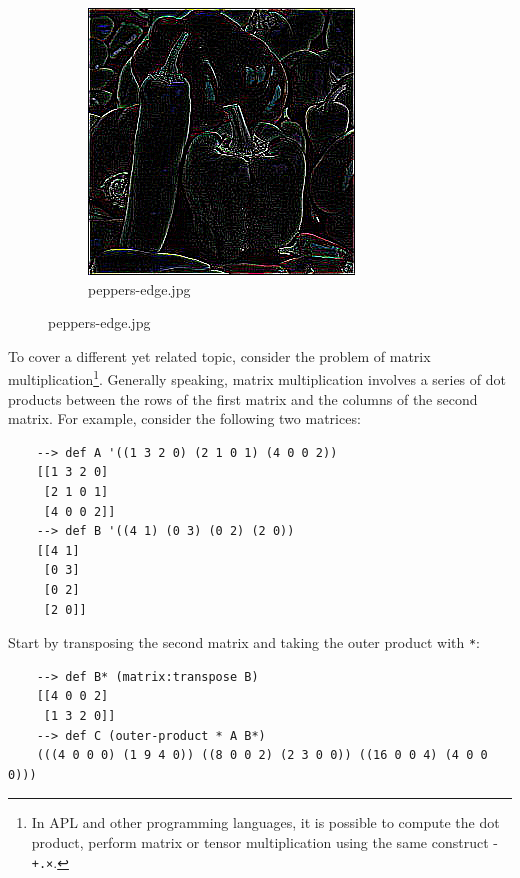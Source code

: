 \begin{figure}[H]
\begin{subfigure}{0.25\textwidth}
    \end{subfigure}
    \begin{subfigure}{0.25\textwidth}
        \caption{peppers-edge.jpg}
        \includegraphics[width=\textwidth]{figures/peppers-edge.jpg}
    \end{subfigure}
\end{figure}

To cover a different yet related topic, consider the problem of matrix multiplication\footnote{In APL and other programming languages, it is possible to compute the dot product, perform matrix or tensor multiplication using the same construct - \verb|+.×|.}. Generally speaking, matrix multiplication involves a series of dot products between the rows of the first matrix and the columns of the second matrix. For example, consider the following two matrices:

\begin{Verbatim}
    --> def A '((1 3 2 0) (2 1 0 1) (4 0 0 2))
    [[1 3 2 0]
     [2 1 0 1]
     [4 0 0 2]]
    --> def B '((4 1) (0 3) (0 2) (2 0))
    [[4 1]
     [0 3]
     [0 2]
     [2 0]]
\end{Verbatim}

Start by transposing the second matrix and taking the outer product with \verb|*|:

\begin{Verbatim}
    --> def B* (matrix:transpose B)
    [[4 0 0 2]
     [1 3 2 0]]
    --> def C (outer-product * A B*)
    (((4 0 0 0) (1 9 4 0)) ((8 0 0 2) (2 3 0 0)) ((16 0 0 4) (4 0 0 0)))
\end{Verbatim}

